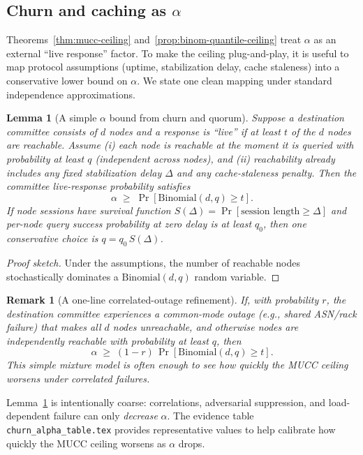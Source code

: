 \documentclass[11pt]{article}
\newtheorem{lemma}{Lemma}
\newtheorem{remark}{Remark}
\begin{document}
\subsection{Churn and caching as \texorpdfstring{$\alpha$}{alpha}}
\label{sec:churn_caching}
Theorems~\ref{thm:mucc-ceiling} and~\ref{prop:binom-quantile-ceiling} treat $\alpha$ as an external ``live response'' factor.
To make the ceiling plug-and-play, it is useful to map protocol assumptions (uptime, stabilization delay, cache staleness) into a conservative lower bound on $\alpha$.
We state one clean mapping under standard independence approximations.

\begin{lemma}[A simple $\alpha$ bound from churn and quorum]
\label{lem:alpha-from-churn}
Suppose a destination committee consists of $d$ nodes and a response is ``live'' if at least $t$ of the $d$ nodes are reachable.
Assume (i) each node is reachable at the moment it is queried with probability at least $q$ (independent across nodes), and (ii) reachability already includes any fixed stabilization delay $\Delta$ and any cache-staleness penalty.
Then the committee live-response probability satisfies
\[
\alpha\;\ge\;\Pr[\mathrm{Binomial}(d,q)\ge t].
\]
If node sessions have survival function $S(\Delta)=\Pr[\text{session length}\ge \Delta]$ and per-node query success probability at zero delay is at least $q_0$, then one conservative choice is $q=q_0\,S(\Delta)$.
\end{lemma}

\begin{proof}[Proof sketch]
Under the assumptions, the number of reachable nodes stochastically dominates a $\mathrm{Binomial}(d,q)$ random variable.
\end{proof}

\begin{remark}[A one-line correlated-outage refinement]
If, with probability $r$, the destination committee experiences a common-mode outage (e.g., shared ASN/rack failure) that makes all $d$ nodes unreachable, and otherwise nodes are independently reachable with probability at least $q$, then
\[\alpha\;\ge\;(1-r)\,\Pr[\mathrm{Binomial}(d,q)\ge t].\]
This simple mixture model is often enough to see how quickly the MUCC ceiling worsens under correlated failures.
\end{remark}

Lemma~\ref{lem:alpha-from-churn} is intentionally coarse: correlations, adversarial suppression, and load-dependent failure can only \emph{decrease} $\alpha$.
The evidence table \texttt{churn\_alpha\_table.tex} provides representative values to help calibrate how quickly the MUCC ceiling worsens as $\alpha$ drops.
\end{document}
